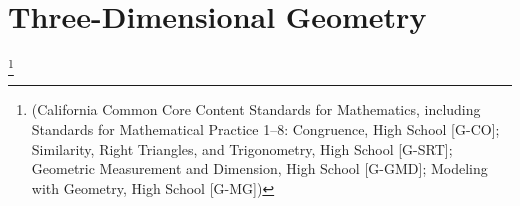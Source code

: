 \section[3D Geometry]{Three-Dimensional Geometry}







\footnote[3]{(California Common Core Content Standards for Mathematics, including Standards for Mathematical Practice
1–8: Congruence, High School [G-CO]; Similarity, Right Triangles, and Trigonometry, High School [G-SRT];
Geometric Measurement and Dimension, High School [G-GMD]; Modeling with Geometry, High School
[G-MG])}